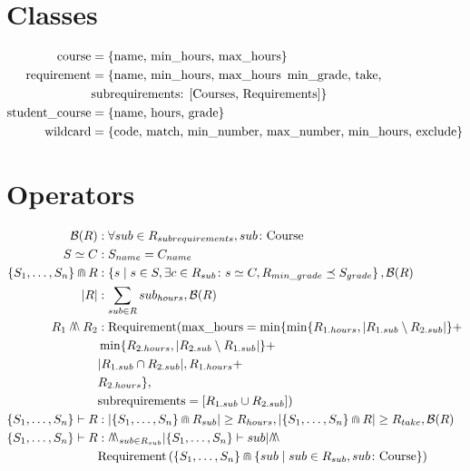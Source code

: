 \documentclass{article}
\begin{document}
\section{Classes}
\begin{align*}
  \mbox{course} &= \{\mbox{name, min\_hours, max\_hours}\} \\
  \mbox{requirement} &= \{\mbox{name, min\_hours, max\_hours\, min\_grade,
take,} \\ &\mbox{subrequirements: [Courses, Requirements]}\} \\
\mbox{student\_course} &= \{\mbox{name, hours, grade}\} \\
\mbox{wildcard} &= \{\mbox{code, match, min\_number, max\_number, min\_hours,
exclude}\}
\end{align*}

\section{Operators}
\begin{align*}
  \mathcal{B}(R) &: \forall sub \in R_{subrequirements}, sub \colon \mbox{Course}
  \\
  S \simeq C &: S_{name} = C_{name} \\
  \{S_1,\ldots,S_n\}\Cap R &: \left\{ s \mid s \in S, \exists c
\in R_{sub} \colon s \simeq C, R_{min\_grade} \preceq S_{grade} \right\}, \mathcal{B}(R) \\
|R| &: \sum_{sub \in R} sub_{hours}, \mathcal{B}(R) \\
R_1 \merge R_2 &: \mbox{Requirement}(\mbox{max\_hours} = \min\{\min\{R_{1.hours},
|R_{1.sub} \setminus R_{2.sub}|\} + \\  &\min\{R_{2.hours}, |R_{2.sub}
\setminus R_{1.sub}|\} + \\ &|R_{1.sub} \cap R_{2.sub}|, R_{1.hours} + \\
                            &R_{2.hours}\}, \\ &\mbox{subrequirements} =
[R_{1.sub} \cup R_{2.sub}])
\\
\{S_1,\ldots,S_n\} \vdash R &: |\{S_1, \ldots, S_n\} \Cap R_{sub}| \geq
R_{hours}, |\{S_1, \ldots, S_n\} \Cap R| \geq R_{take}, \mathcal{B}(R) \\
\{S_1,\ldots,S_n\} \vdash R &: \merge_{sub \in R_{sub}} |\{S_1,\ldots,S_n\}
\vdash sub| \merge \\
& \mbox{Requirement}\left(\{S_1,\ldots,S_n\} \Cap \left\{sub
\mid sub \in R_{sub}, sub \colon \mbox{Course} \right\}\right)
\end{align*}
\end{document}
